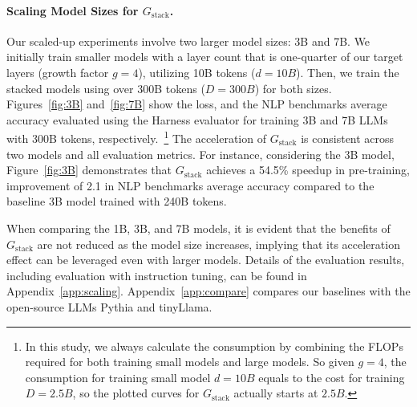 \documentclass{article}
\begin{document}
\paragraph{Scaling Model Sizes for $G_{\text{stack}}$.}
Our scaled-up experiments involve two larger model sizes: 3B and 7B. 
We initially train smaller models with a layer count that is one-quarter of our target layers (growth factor $g=4$), utilizing 10B tokens ($d=10B$). 
Then, we train the stacked models using over 300B tokens ($D=300B$) for both sizes.
Figures~\ref{fig:3B} and~\ref{fig:7B} show the loss, and the NLP benchmarks average accuracy evaluated using the Harness evaluator for training 3B and 7B LLMs with 300B tokens, respectively.~\footnote{In this study, we always calculate the consumption by combining the FLOPs required for both training small models and large models. So given $g=4$, the consumption for training small model $d=10B$ equals to the cost for training $D=2.5B$, so the plotted curves for $G_{\text{stack}}$ actually starts at $2.5B$.}
The acceleration of $G_{\text{stack}}$ is consistent across two models and all evaluation metrics. For instance, considering the 3B model, Figure~\ref{fig:3B} demonstrates that $G_{\text{stack}}$ achieves a 54.5\% speedup in pre-training, improvement of 2.1 in NLP benchmarks average accuracy compared to the baseline 3B model trained with 240B tokens.

When comparing the 1B, 3B, and 7B models, it is evident that the benefits of $G_{\text{stack}}$ are not reduced as the model size increases, implying that its acceleration effect can be leveraged even with larger models.
Details of the evaluation results, including evaluation with instruction tuning, can be found in Appendix~\ref{app:scaling}.
Appendix~\ref{app:compare} compares our baselines with the open-source LLMs Pythia and tinyLlama.
\end{document}
